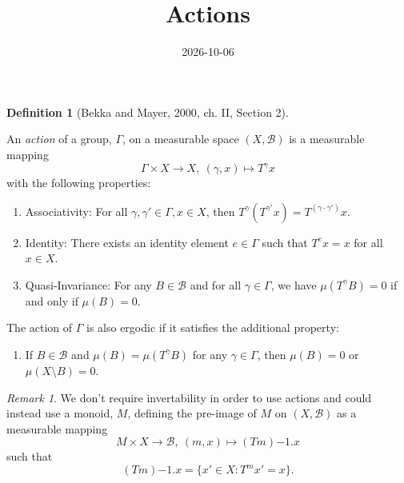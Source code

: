 \documentclass[
  british,
]{article}
\title{Actions}
\author{}
\date{2026-10-06}
\providecommand{\tightlist}{%
  \setlength{\itemsep}{0pt}\setlength{\parskip}{0pt}}
\theoremstyle{definition}
\newtheorem{definition}{Definition}[section]
\theoremstyle{remark}
\newtheorem{refremark}{Remark}[section]
\newcommand{\Group}{{\Gamma}}
\newcommand{\GroupAction}[2]{T^{#1}{#2}}
\newcommand{\GroupActionPreImage}[2]{(T{#1}){-1}.{#2}}
\newcommand{\GroupElement}{{\gamma}}
\newcommand{\GroupIdentity}{{e}}
\newcommand{\GroupOperation}[2]{{#1}\cdot{#2}}
\newcommand{\Measure}{{\mu}}
\newcommand{\Monoid}{{M}}
\newcommand{\MonoidElement}{{m}}
\newcommand{\SigmaAlgebra}[1]{{\mathscr{#1}}}
\begin{document}
\maketitle


\begin{definition}[{Bekka and Mayer, 2000, ch. II, Section
2}]\protect\hypertarget{def-action}{}\label{def-action}

An \emph{action} of a group, \(\Group\), on a measurable space
\((X,\SigmaAlgebra{B})\) is a measurable mapping
\[\Group\times X\rightarrow X,\ (\GroupElement,x)\mapsto \GroupAction{\GroupElement}{x} \]
with the following properties:

\begin{enumerate}
\def\labelenumi{\arabic{enumi}.}
\tightlist
\item
  Associativity: For all
  \(\GroupElement,\GroupElement'\in \Group,x\in X\), then
  \(\GroupAction{\GroupElement}{(\GroupAction{\GroupElement'}{x})}=\GroupAction{(\GroupOperation{\GroupElement}{\GroupElement'})}{x}\).
\item
  Identity: There exists an identity element \(\GroupIdentity\in\Group\)
  such that \(\GroupAction{\GroupIdentity}{x}=x\) for all \(x\in X\).
\item
  Quasi-Invariance: For any \(B\in\SigmaAlgebra{B}\) and for all
  \(\GroupElement\in\Group\), we have
  \(\Measure(\GroupAction{\GroupElement}{B})=0\) if and only if
  \(\Measure(B)=0\).
\end{enumerate}

The action of \(\Group\) is also ergodic if it satisfies the additional
property:

\begin{enumerate}
\def\labelenumi{\arabic{enumi}.}
\setcounter{enumi}{3}
\tightlist
\item
  If \(B\in\SigmaAlgebra{B}\) and
  \(\Measure(B)=\Measure(\GroupAction{\GroupElement}{B})\) for any
  \(\GroupElement\in\Group\), then \(\Measure(B)=0\) or
  \(\Measure(X\setminus B)=0\).
\end{enumerate}

\end{definition}

\begin{refremark}
We don't require invertability in order to use actions and could instead
use a monoid, \(\Monoid\), defining the pre-image of \(\Monoid\) on
\((X,\SigmaAlgebra{B})\) as a measurable mapping
\[\Monoid\times X\rightarrow \SigmaAlgebra{B},\ (\MonoidElement,x)\mapsto \GroupActionPreImage{\MonoidElement}{x} \]
such that
\[\GroupActionPreImage{\MonoidElement}{x}=\{x'\in X: \GroupAction{\MonoidElement}{x'}=x \}. \]

\label{rem-MonoidAction}

\end{refremark}
\end{document}
